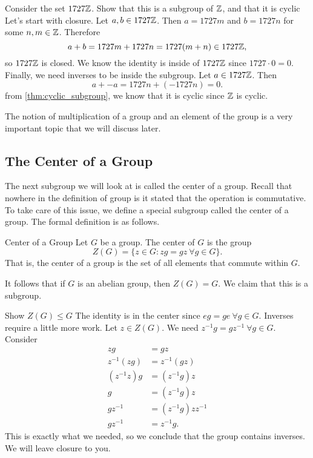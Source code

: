 \begin{example}{Consider the set $1727\mathbb{Z}$. Show that this is a subgroup of $\mathbb{Z}$, and that it is cyclic}
	Let's start with closure. Let $a,b\in 1727\mathbb{Z}$. Then $a=1727m$ and $b=1727n$ for some $n,m\in\mathbb{Z}$. Therefore
	\[
		a+b=1727m+1727n= 1727(m+n)\in 1727\mathbb{Z},
	\]
	so $1727\mathbb{Z}$ is closed. We know the identity is inside of $1727\mathbb{Z}$ since $1727\cdot 0=0$. Finally, we need inverses to be inside the subgroup. Let $a\in 1727\mathbb{Z}$. Then
	\[
		a+-a= 1727n + (-1727n) = 0.
	\]
	from \cref{thm:cyclic_subgroup}, we know that it is cyclic since $\mathbb{Z}$ is cyclic.
\end{example}
The notion of multiplication of a group and an element of the group is a very important topic that we will discuss later.

\subsection*{The Center of a Group}
The next subgroup we will look at is called the center of a group. Recall that nowhere in the definition of group is it stated that the operation is commutative. To take care of this issue, we define a special subgroup called the center of a group. The formal definition is as follows.
\begin{definition}{Center of a Group}
	Let $G$ be a group. The center of $G$ is the group
	\[
		Z(G)=\{z\in G : zg=gz\ \forall g\in G\}.
	\]
	That is, the center of a group is the set of all elements that commute within $G$.
\end{definition}
It follows that if $G$ is an abelian group, then $Z(G)=G$. We claim that this is a subgroup.
\begin{example}{Show $Z(G)\leq G$}
	The identity is in the center since $eg = ge\ \forall g\in G$. Inverses require a little more work. Let $z\in Z(G)$. We need $z^{-1}g=gz^{-1}\ \forall g\in G$. Consider
	\begin{align*}
		zg         & =gz                \\
		z^{-1}(zg) & = z^{-1}(gz)       \\
		(z^{-1}z)g & = (z^{-1}g)z       \\
		g          & = (z^{-1}g)z       \\
		gz^{-1}    & = (z^{-1}g)zz^{-1} \\
		gz^{-1}    & = z^{-1}g.
	\end{align*}
	This is exactly what we needed, so we conclude that the group contains inverses. We will leave closure to you.
\end{example}
